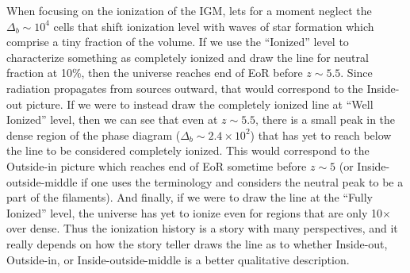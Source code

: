 When focusing on the ionization of the IGM, lets for a moment neglect the $\Delta_b \sim10^4$ cells that shift ionization level with waves of star formation which comprise a tiny fraction of the volume.  If we use the ``Ionized'' level to characterize something as completely ionized and draw the line for neutral fraction at 10\%, then the universe reaches end of EoR before $z \sim 5.5$.  Since radiation propagates from sources outward, that would correspond to the Inside-out picture.  If we were to instead draw the completely ionized line at ``Well Ionized'' level, then we can see that even at $z \sim 5.5$, there is a small peak in the dense region of the phase diagram ($\Delta_b \sim 2.4\times10^2$) that has yet to reach below the line to be considered completely ionized.  This would correspond to the Outside-in picture which reaches end of EoR sometime before $z \sim 5$ (or Inside-outside-middle if one uses the \cite{FinlatorEtAl2009} terminology and considers the neutral peak to be a part of the filaments).  And finally, if we were to draw the line at the ``Fully Ionized'' level, the universe has yet to ionize even for regions that are only 10$\times$ over dense.  Thus the ionization history is a story with many perspectives, and it really depends on how the story teller draws the line as to whether Inside-out, Outside-in, or Inside-outside-middle is a better qualitative description. 



